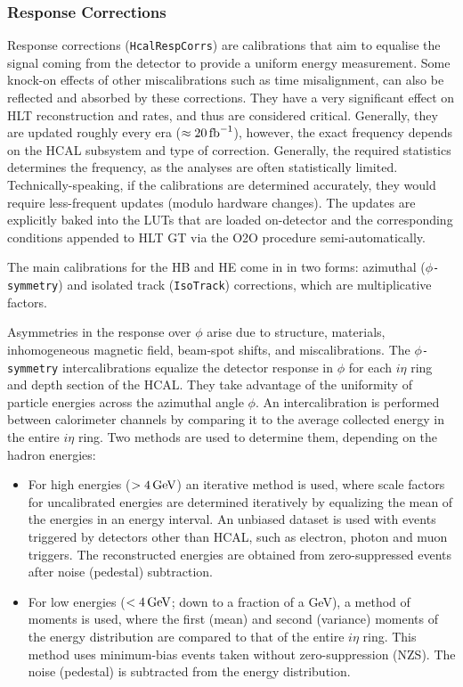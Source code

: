 \subsubsection{Response Corrections}
Response corrections (\texttt{HcalRespCorrs}) are calibrations that aim to equalise the signal coming from the detector to provide a uniform energy measurement. Some knock-on effects of other miscalibrations such as time misalignment, can also be reflected and absorbed by these corrections. They have a very significant effect on HLT reconstruction and rates, and thus are considered critical. Generally, they are updated roughly every era ($\approx 20 \mbox{\ensuremath{\,\text{fb}^{-1}}}$), however, the exact frequency depends on the HCAL subsystem and type of correction. Generally, the required statistics determines the frequency, as the analyses are often statistically limited. Technically-speaking, if the calibrations are determined accurately, they would require less-frequent updates (modulo hardware changes). The updates are explicitly baked into the LUTs that are loaded on-detector and the corresponding conditions appended to HLT GT via the O2O procedure semi-automatically.

The main calibrations for the HB and HE come in in two forms: azimuthal ($\phi$\texttt{-symmetry}) and isolated track (\texttt{IsoTrack}) corrections, which are multiplicative factors. 

Asymmetries in the response over $\phi$ arise due to structure, materials, inhomogeneous magnetic field, beam-spot shifts, and miscalibrations. The $\phi$\texttt{-symmetry} intercalibrations equalize the detector response in $\phi$ for each $i\eta$ ring and depth section of the HCAL. They take advantage of the uniformity of particle energies across the azimuthal angle $\phi$. An intercalibration is performed between calorimeter channels by comparing it to the average collected energy in the entire $i\eta$ ring. Two methods are used to determine them, depending on the hadron energies:
\begin{itemize}
    \item For high energies ($> 4 \,\text{Ge\hspace{-.08em}V}$) an iterative method is used, where scale factors for uncalibrated energies are determined iteratively by equalizing the mean of the energies in an energy interval. An unbiased dataset is used with events triggered by detectors other than HCAL, such as electron, photon and muon triggers. The reconstructed energies are obtained from zero-suppressed events after noise (pedestal) subtraction.
    \item For low energies ($< 4 \,\text{Ge\hspace{-.08em}V}$; down to a fraction of a GeV), a method of moments is used, where the first (mean) and second (variance) moments of the energy distribution are compared to that of the entire $i\eta$ ring. This method uses minimum-bias events taken without zero-suppression (NZS). The noise (pedestal) is subtracted from the energy distribution.
\end{itemize}


